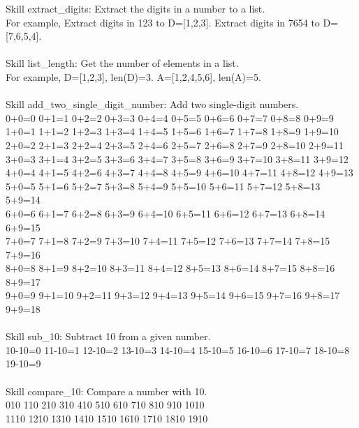 \documentclass{article} \usepackage{arxiv}
\begin{document}
\begin{tcolorbox}[title = {Skills for Addition}, colback = Apricot!25!white, colframe = BrickRed!75!black] 
Skill extract\_digits: Extract the digits in a number to a list.  \\
For example, Extract digits in 123 to D=[1,2,3]. Extract digits in 7654 to D=[7,6,5,4]. \\ \\

Skill list\_length: Get the number of elements in a list.  \\
For example, D=[1,2,3], len(D)=3. A=[1,2,4,5,6], len(A)=5. \\ \\

Skill add\_two\_single\_digit\_number: Add two single-digit numbers.  \\
0+0=0 0+1=1 0+2=2 0+3=3 0+4=4 0+5=5 0+6=6 0+7=7 0+8=8 0+9=9 \\
1+0=1 1+1=2 1+2=3 1+3=4 1+4=5 1+5=6 1+6=7 1+7=8 1+8=9 1+9=10 \\
2+0=2 2+1=3 2+2=4 2+3=5 2+4=6 2+5=7 2+6=8 2+7=9 2+8=10 2+9=11 \\
3+0=3 3+1=4 3+2=5 3+3=6 3+4=7 3+5=8 3+6=9 3+7=10 3+8=11 3+9=12 \\
4+0=4 4+1=5 4+2=6 4+3=7 4+4=8 4+5=9 4+6=10 4+7=11 4+8=12 4+9=13 \\
5+0=5 5+1=6 5+2=7 5+3=8 5+4=9 5+5=10 5+6=11 5+7=12 5+8=13 5+9=14 \\
6+0=6 6+1=7 6+2=8 6+3=9 6+4=10 6+5=11 6+6=12 6+7=13 6+8=14 6+9=15 \\
7+0=7 7+1=8 7+2=9 7+3=10 7+4=11 7+5=12 7+6=13 7+7=14 7+8=15 7+9=16 \\
8+0=8 8+1=9 8+2=10 8+3=11 8+4=12 8+5=13 8+6=14 8+7=15 8+8=16 8+9=17 \\
9+0=9 9+1=10 9+2=11 9+3=12 9+4=13 9+5=14 9+6=15 9+7=16 9+8=17 9+9=18 \\ \\

Skill sub\_10: Subtract 10 from a given number. \\
10-10=0 11-10=1 12-10=2 13-10=3 14-10=4 15-10=5 16-10=6 17-10=7 18-10=8 19-10=9 \\ \\


Skill compare\_10: Compare a number with 10.  \\
010 110 210 310 410 510 610 710 810 910 1010 \\
1110 1210 1310 1410 1510 1610 1710 1810 1910 
\end{tcolorbox}
\noindent\begin{minipage}{\textwidth} 
 \label{Tab:simple_add_skill}
\end{minipage}
\end{document}
